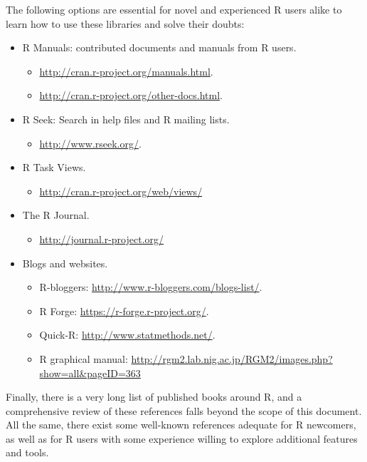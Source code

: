 The following options are essential for novel and experienced R users alike to
learn how to use these libraries and solve their doubts:

\begin{itemize}
 \item R Manuals: contributed documents and manuals from R users.
 \begin{itemize}
  \item \url{http://cran.r-project.org/manuals.html}.
  \item \url{http://cran.r-project.org/other-docs.html}.
 \end{itemize}

 \item R Seek: Search in help files and R mailing lists.
 \begin{itemize}
  \item \url{http://www.rseek.org/}.
 \end{itemize}

  \item R Task Views.
  \begin{itemize}
   \item \url{http://cran.r-project.org/web/views/}
  \end{itemize}

 \item The R Journal.
 \begin{itemize}
  \item \url{http://journal.r-project.org/}
 \end{itemize}

  \item Blogs and websites.
  \begin{itemize}
   \item R-bloggers: \url{http://www.r-bloggers.com/blogs-list/}.
   \item R Forge: \url{https://r-forge.r-project.org/}.
   \item Quick-R: \url{http://www.statmethods.net/}.
   \item R graphical manual: \url{http://rgm2.lab.nig.ac.jp/RGM2/images.php?show=all&pageID=363}
  \end{itemize}

\end{itemize}

Finally, there is a very long list of published books around R, and a comprehensive
review of these references falls beyond the scope of this document. All the same,
there exist some well-known references adequate for R newcomers, as well as for
R users with some experience willing to explore additional features and tools.

